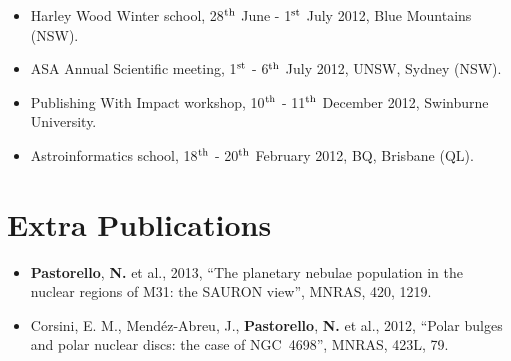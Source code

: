 \documentclass[useAMS,usenatbib,onecolumn]{mnras}
\begin{document}
	\begin{itemize}
		\item{Harley Wood Winter school}, 28$^{\rm{th}}$ June - 1$^{\rm{st}}$ July 2012, Blue Mountains (NSW).
		\item{ASA Annual Scientific meeting}, 1$^{\rm{st}}$ - 6$^{\rm{th}}$ July 2012, UNSW, Sydney (NSW).
		\item{Publishing With Impact workshop}, 10$^{\rm{th}}$ - 11$^{\rm{th}}$ December 2012, Swinburne University.
		\item{Astroinformatics school}, 18$^{\rm{th}}$ - 20$^{\rm{th}}$ February 2012, BQ, Brisbane (QL).  
	\end{itemize}



	
\section{Extra Publications}											
\label{sec:publications}  
	\begin{itemize}
	\item{\textbf{Pastorello}, \textbf{N.} et al., 2013}, ``The planetary nebulae population in the nuclear regions of M31: the SAURON view'', MNRAS, 420, 1219.
	\item{Corsini, E. M., Mend\'ez-Abreu, J., \textbf{Pastorello}, \textbf{N.} et al., 2012}, ``Polar bulges and polar nuclear discs: the case of NGC~4698'', MNRAS, 423L, 79.	
\end{itemize}		


\end{document}
